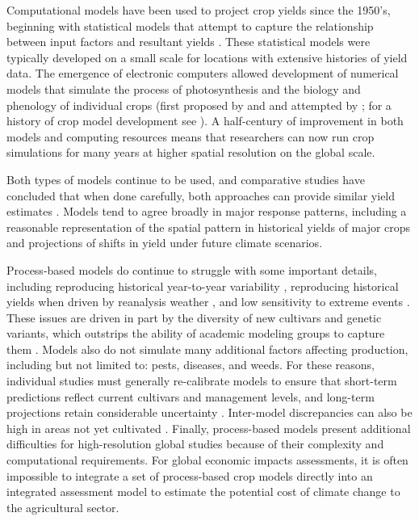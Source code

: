 \documentclass[esd, manuscript]{copernicus} %
\begin{document}
Computational models have been used to project crop yields since the 1950's, beginning with statistical models  that attempt to capture the relationship between input factors and resultant yields \citep[e.g.][]{Heady57, Heady61}. These statistical models were typically developed on a small scale for locations with extensive histories of yield data. The emergence of electronic computers allowed development of numerical models that simulate the process of photosynthesis and the biology and phenology of individual crops (first proposed by \citet{wit58} and \citet{Duncan67} and attempted by \citet{Duncan72}; for a history of crop model development see \citet{Rosenzweig2014}). A half-century of improvement in both models and computing resources means that researchers can now run crop simulations for many years at higher spatial resolution on the global scale. 

Both types of models continue to be used, and comparative studies have concluded that when done carefully, both approaches can provide similar yield estimates \citep[e.g.][]{Lobell2010, Moore2017, Roberts2017, zhao2017}. Models tend to agree broadly in major response patterns, including a reasonable representation of the spatial pattern in historical yields of major crops \citep[e.g.][]{Elliott2015, muller_global_2017} and projections of shifts in yield under future climate scenarios.

Process-based models do continue to struggle with some important details, including reproducing historical year-to-year variability \citep[e.g.][]{muller_global_2017}, reproducing historical yields when driven by reanalysis weather \citep[e.g.][]{Glotter14}, and low sensitivity to extreme events \citep[e.g.][]{Glotter15, Jag2018, schewe2019}. These issues are driven in part by the diversity of new cultivars and genetic variants, which outstrips the ability of academic modeling groups to capture them \citep[e.g.][]{JONES2017b}. Models also do not simulate many additional factors affecting production, including but not limited to: pests, diseases, and weeds. For these reasons, individual studies must generally re-calibrate models to ensure that short-term predictions reflect current cultivars and management levels, and long-term projections retain considerable uncertainty \citep{WOLF2002217, JAGTAP200273, Iizumi2010, ANGULO201332, Asseng2013, Asseng2015}. Inter-model discrepancies can also be high in areas not yet cultivated \citep[e.g.][]{Challinor2014, WHITE2011357}. Finally, process-based models present additional difficulties for high-resolution global studies because of their complexity and computational requirements. For global economic impacts assessments, it is often impossible to integrate a set of process-based crop models directly into an integrated assessment model to estimate the potential cost of climate change to the agricultural sector.
\end{document}
